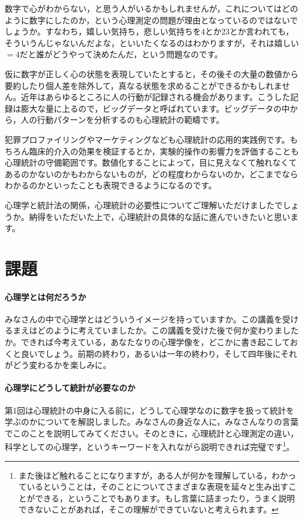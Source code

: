 \documentclass{ltjsbook}
\begin{document}
数字で心がわからない，と思う人がいるかもしれませんが，これについてはどのように数字にしたのか，という心理測定の問題が理由となっているのではないでしょうか。すなわち，嬉しい気持ち，悲しい気持ちを4とか23とか言われても，そういうんじゃないんだよな，といいたくなるのはわかりますが，それは嬉しい$=4$だと誰がどうやって決めたんだ，という問題なのです。

仮に数字が正しく心の状態を表現していたとすると，その後その大量の数値から要約したり個人差を除外して，真なる状態を求めることができるかもしれません。近年はあらゆるところに人の行動が記録される機会があります。こうした記録は膨大な量に上るので，ビッグデータと呼ばれています。ビッグデータの中から，人の行動パターンを分析するのも心理統計の範疇です。

犯罪プロファイリングやマーケティングなども心理統計の応用的実践例です。もちろん臨床的介入の効果を検証するとか，実験的操作の影響力を評価することも心理統計の守備範囲です。数値化することによって，目に見えなくて触れなくてあるのかないのかもわからないものが，どの程度わからないのか，どこまでならわかるのかといったことも表現できるようになるのです。

心理学と統計法の関係，心理統計の必要性についてご理解いただけましたでしょうか。納得をいただいた上で，心理統計の具体的な話に進んでいきたいと思います。
\section{課題}
\paragraph{心理学とは何だろうか}
みなさんの中で心理学とはどういうイメージを持っていますか。この講義を受けるまえはどのように考えていましたか。この講義を受けた後で何か変わりましたか。できれば今考えている，あなたなりの心理学像を，どこかに書き起こしておくと良いでしょう。前期の終わり，あるいは一年の終わり，そして四年後にそれがどう変わるかを楽しみに。
\paragraph{心理学にどうして統計が必要なのか}
第1回は心理統計の中身に入る前に，どうして心理学なのに数字を扱って統計を学ぶのかについてを解説しました。みなさんの身近な人に，みなさんなりの言葉でこのことを説明してみてください。そのときに，心理統計と心理測定の違い，科学としての心理学，というキーワードを入れながら説明できれば完璧です\footnote{また後ほど触れることになりますが，ある人が何かを理解している，わかっているということは，そのことについてさまざまな表現を延々と生み出すことができる，ということでもあります。もし言葉に詰まったり，うまく説明できないことがあれば，そこの理解ができていないと考えられます。}。
\end{document}
